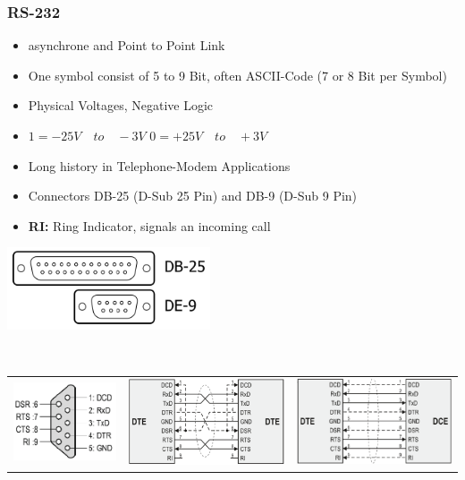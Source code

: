 \subsubsection{RS-232}
\begin{minipage}{10cm}
	\begin{itemize}
		\item asynchrone and Point to Point Link
		\item One symbol consist of 5 to 9 Bit, often ASCII-Code (7 or 8 Bit per Symbol)
		\item Physical Voltages, Negative Logic
		\item $1=-25V \quad to \quad -3V$\newline
		$0=+25V\quad to \quad +3V$
		\item Long history in Telephone-Modem Applications
		\item Connectors DB-25 (D-Sub 25 Pin) and DB-9 (D-Sub 9 Pin)
		\item\textbf{RI: }Ring Indicator, signals an incoming call
	\end{itemize}
\end{minipage}
\begin{minipage}{6cm}
	\includegraphics[width=6cm]{images/Connectors_RS.png}
\end{minipage}
\\
\begin{tabular}{ccc}
	\includegraphics[width=4cm]{images/pin_RS.png} & \includegraphics[width=6cm]{images/cable2_RS.png} & \includegraphics[width=6cm]{images/cable_RS.png}\\
\end{tabular}
